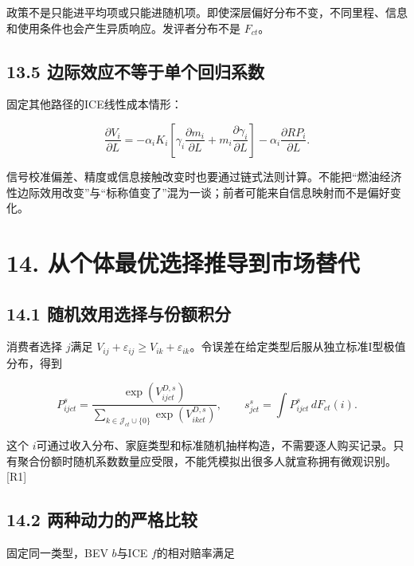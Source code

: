 \documentclass[
  11pt,
]{article}
\begin{document}
政策不是只能进平均项或只能进随机项。即使深层偏好分布不变，不同里程、信息和使用条件也会产生异质响应。发评者分布不是
\(F_{ct}\)。

\subsection{13.5
边际效应不等于单个回归系数}\label{ux8fb9ux9645ux6548ux5e94ux4e0dux7b49ux4e8eux5355ux4e2aux56deux5f52ux7cfbux6570}

固定其他路径的ICE线性成本情形：

\[
\frac{\partial V_i}{\partial L}
=-\alpha_iK_i\left[
\gamma_i\frac{\partial m_i}{\partial L}
+m_i\frac{\partial\gamma_i}{\partial L}\right]
-\alpha_i\frac{\partial RP_i}{\partial L}.
\tag{57}
\]

信号校准偏差、精度或信息接触改变时也要通过链式法则计算。不能把``燃油经济性边际效用改变''与``标称值变了''混为一谈；前者可能来自信息映射而不是偏好变化。

\section{14.
从个体最优选择推导到市场替代}\label{ux4eceux4e2aux4f53ux6700ux4f18ux9009ux62e9ux63a8ux5bfcux5230ux5e02ux573aux66ffux4ee3}

\subsection{14.1
随机效用选择与份额积分}\label{ux968fux673aux6548ux7528ux9009ux62e9ux4e0eux4efdux989dux79efux5206}

消费者选择 \(j\)满足
\(V_{ij}+\varepsilon_{ij}\geq V_{ik}+\varepsilon_{ik}\)。令误差在给定类型后服从独立标准I型极值分布，得到

\[
P_{ijct}^{s}=\frac{\exp(V_{ijct}^{D,s})}
{\sum_{k\in\mathcal J_{ct}\cup\{0\}}\exp(V_{ikct}^{D,s})},\qquad
s_{jct}^{s}=\int P_{ijct}^{s}\,dF_{ct}(i).
\tag{58}
\]

这个
\(i\)可通过收入分布、家庭类型和标准随机抽样构造，不需要逐人购买记录。只有聚合份额时随机系数数量应受限，不能凭模拟出很多人就宣称拥有微观识别。{[}R1{]}

\subsection{14.2
两种动力的严格比较}\label{ux4e24ux79cdux52a8ux529bux7684ux4e25ux683cux6bd4ux8f83}

固定同一类型，BEV \(b\)与ICE \(f\)的相对赔率满足
\end{document}
